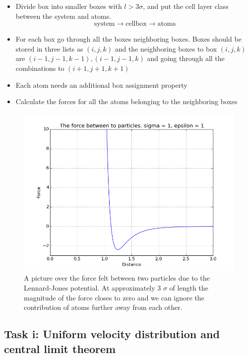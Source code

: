 \documentclass[11pt]{article}
\begin{document}
	\begin{itemize}
		\item Divide box into smaller boxes with \(l >3\sigma\), and put the cell layer class between the system and atoms.
				\[\text{system} \rightarrow\text{cellbox} \rightarrow \text{atoms}\]
		\item For each box go through all the boxes neighboring boxes. Boxes should be stored in three lists as \((i,j,k)\) and the neighboring boxes to box \((i,j,k)\) are \( (i-1, j-1, k-1), (i-1,j-1,k) \) and going through all the combinations to \( (i+1,j+1,k+1) \)
		\item Each atom needs an additional box assignment property
		\item Calculate the forces for all the atoms belonging to the neighboring boxes
	\end{itemize}

	
	\begin{figure}
		\includegraphics[scale = 0.5]{Figures/forcePlot}
		\caption{A picture over the force felt between two particles due to the Lennard-Jones potential. At approximately 3 \(\sigma\) of length the magnitude of the force closes to zero and we can ignore the contribution of atoms further away from each other.}
		\label{fig:force}
	\end{figure}

	\subsection{Task i: Uniform velocity distribution and central limit theorem}
\end{document}
